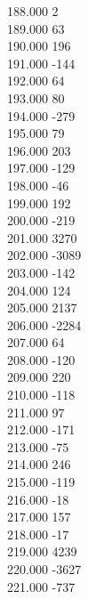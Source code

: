 { 188.000	2 \\
 189.000	63 \\
 190.000	196 \\
 191.000	-144 \\
 192.000	64 \\
 193.000	80 \\
 194.000	-279 \\
 195.000	79 \\
 196.000	203 \\
 197.000	-129 \\
 198.000	-46 \\
 199.000	192 \\
 200.000	-219 \\
 201.000	3270 \\
 202.000	-3089 \\
 203.000	-142 \\
 204.000	124 \\
 205.000	2137 \\
 206.000	-2284 \\
 207.000	64 \\
 208.000	-120 \\
 209.000	220 \\
 210.000	-118 \\
 211.000	97 \\
 212.000	-171 \\
 213.000	-75 \\
 214.000	246 \\
 215.000	-119 \\
 216.000	-18 \\
 217.000	157 \\
 218.000	-17 \\
 219.000	4239 \\
 220.000	-3627 \\
 221.000	-737 \\
}
